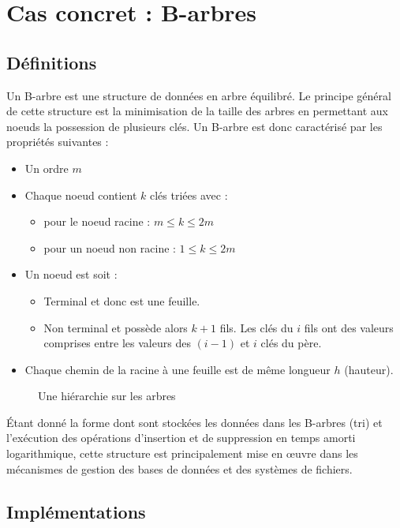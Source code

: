 \chapter[B-arbres]{Cas concret : B-arbres%
}
\section{Définitions}
Un B-arbre est une structure de données en arbre équilibré. Le principe général de cette structure est la minimisation de la taille des arbres en permettant aux noeuds la possession de plusieurs clés. Un B-arbre est donc caractérisé par les propriétés suivantes :
\begin{itemize}
\item Un ordre $m$
\item Chaque noeud contient $k$ clés triées avec :
\begin{itemize}
\item pour le noeud racine : $m \leq k \leq 2m$
\item pour un noeud non racine : $1 \leq k \leq 2m$
\end{itemize}
\item Un noeud est soit :
\begin{itemize}
\item Terminal et donc est une feuille.
\item Non terminal et possède alors $k+1$ fils. Les clés du $i$ fils ont des valeurs comprises entre les valeurs des $(i-1)$ et $i$ clés du père.
\end{itemize}
\item Chaque chemin de la racine à une feuille est de même longueur $h$ (hauteur).
\end{itemize}

\begin{figure}[h]
	\centering
	\caption{Une hiérarchie sur les arbres}
	\label{fig:hierarchie}
\end{figure}

Étant donné la forme dont sont stockées les données dans les B-arbres (tri) et l'exécution des opérations d'insertion et de suppression en temps amorti logarithmique, cette structure est principalement mise en œuvre dans les mécanismes de gestion des bases de données et des systèmes de fichiers.
\section{Implémentations}
